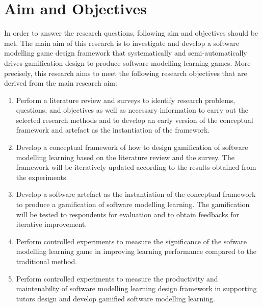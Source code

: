 \documentclass[12pt, a4paper]{report}
\begin{document}
\section{Aim and Objectives}
In order to answer the research questions, following aim and objectives should be met. The main aim of this research is to investigate and develop a software modelling game design framework that systematically and semi-automatically drives gamification design to produce software modelling learning games. More precisely, this research aims to meet the following research objectives that are derived from the main research aim:

\begin{enumerate}
\item Perform a literature review and surveys to identify research problems, questions, and objectives as well as necessary information to carry out the selected research methods and to develop an early version of the conceptual framework and artefact as the instantiation of the framework. 
\item Develop a conceptual framework of how to design gamification of software modelling learning based on the literature review and the survey. The framework will be iteratively updated according to the results obtained from the experiments. 
\item Develop a software artefact as the instantiation of the conceptual framework to produce a gamification of software modelling learning. The gamification will be tested to respondents for evaluation and to obtain feedbacks for iterative improvement. 
\item Perform controlled experiments to measure the significance of the sofware modelling learning game in improving learning performance compared to the traditional method.
\item Perform controlled experiments to measure the productivity and maintenabilty of software modelling learning design framework in supporting tutors design and develop gamified software modelling learning. 
\end{enumerate}
\end{document}
